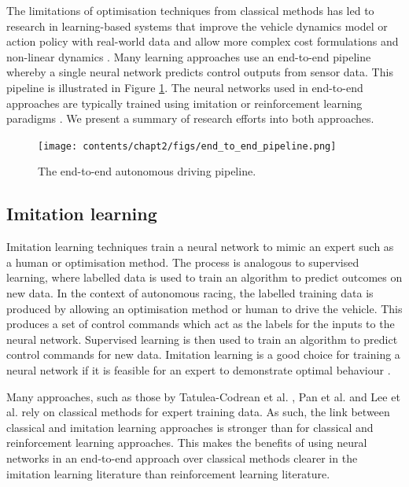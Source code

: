 The limitations of optimisation techniques from classical methods has led to research in learning-based systems that improve the vehicle dynamics model or action policy with real-world data and allow more complex cost formulations and non-linear dynamics \cite{Fuchs2021}.
Many learning approaches use an end-to-end pipeline whereby a single neural network predicts control outputs from sensor data.
This pipeline is illustrated in Figure \ref{fig:end_to_end}.
The neural networks used in end-to-end approaches are typically trained using imitation or reinforcement learning paradigms \cite{Betz2021}. We present a summary of research efforts into both approaches.

\begin{figure}[h]
    \centering
    \texttt{[image: contents/chapt2/figs/end\_to\_end\_pipeline.png]}
    \caption{The end-to-end autonomous driving pipeline.}
    \label{fig:end_to_end}
\end{figure}

\subsection{Imitation learning}
\label{sec:imitation_learning}

Imitation learning techniques train a neural network to mimic an expert such as a human or optimisation method.
The process is analogous to supervised learning, where labelled data is used to train an algorithm to predict outcomes on new data.
In the context of autonomous racing, the labelled training data is produced by allowing an optimisation method or human to drive the vehicle.
This produces a set of control commands which act as the labels for the inputs to the neural network.
Supervised learning is then used to train an algorithm to predict control commands for new data.
Imitation learning is a good choice for training a neural network if it is feasible for an expert to demonstrate optimal behaviour \cite{Osa_2018}.

Many approaches, such as those by Tatulea-Codrean et al. \cite{Tatulea-Codrean2020}, Pan et al. \cite{Pan2017a} and Lee et al. \cite{lee2019} rely on classical methods for expert training data. 
As such, the link between classical and imitation learning approaches is stronger than for classical and reinforcement learning approaches.
This makes the benefits of using neural networks in an end-to-end approach over classical methods clearer in the imitation learning literature than reinforcement learning literature.

